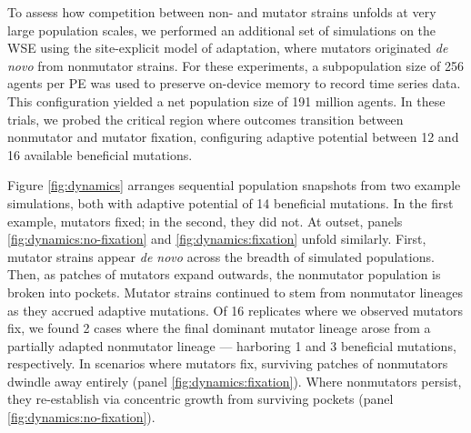 To assess how competition between non- and mutator strains unfolds at very large population scales, we performed an additional set of simulations on the WSE using the site-explicit model of adaptation, where mutators originated \textit{de novo} from nonmutator strains.
For these experiments, a subpopulation size of 256 agents per PE was used to preserve on-device memory to record time series data.
This configuration yielded a net population size of 191 million agents.
In these trials, we probed the critical region where outcomes transition between nonmutator and mutator fixation, configuring adaptive potential between 12 and 16 available beneficial mutations.



Figure \ref{fig:dynamics} arranges sequential population snapshots from two example simulations, both with adaptive potential of 14 beneficial mutations.
In the first example, mutators fixed; in the second, they did not.
At outset, panels \ref{fig:dynamics:no-fixation} and \ref{fig:dynamics:fixation} unfold similarly.
First, mutator strains appear \textit{de novo} across the breadth of simulated populations.
Then, as patches of mutators expand outwards, the nonmutator population is broken into pockets.
Mutator strains continued to stem from nonmutator lineages as they accrued adaptive mutations.
Of 16 replicates where we observed mutators fix, we found 2 cases where the final dominant mutator lineage arose from a partially adapted nonmutator lineage --- harboring 1 and 3 beneficial mutations, respectively.
In scenarios where mutators fix, surviving patches of nonmutators dwindle away entirely (panel \ref{fig:dynamics:fixation}).
Where nonmutators persist, they re-establish via concentric growth from surviving pockets (panel \ref{fig:dynamics:no-fixation}).

% 


